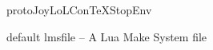 
\startenvironment protoJoyLoLConTeXStopEnv





\createLmsfileFile%
  {default}%
  {lmsfile}%
  {-- A Lua Make System file}

\stopbodymatter

\startbackmatter
  \startchapter[title=Bibliography]
    \placelistofpublications
  \stopchapter
\stopbackmatter

\stopenvironment

